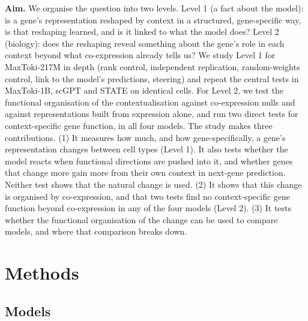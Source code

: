 \documentclass[
  11pt,
]{article}
\begin{document}
\textbf{Aim.} We organise the question into two levels. Level 1 (a fact
about the model): is a gene's representation reshaped by context in a
structured, gene-specific way, is that reshaping learned, and is it
linked to what the model does? Level 2 (biology): does the reshaping
reveal something about the gene's role in each context beyond what
co-expression already tells us? We study Level 1 for MaxToki-217M in
depth (rank control, independent replication, random-weights control,
link to the model's predictions, steering) and repeat the central tests
in MaxToki-1B, scGPT and STATE on identical cells. For Level 2, we test
the functional organisation of the contextualisation against
co-expression nulls and against representations built from expression
alone, and run two direct tests for context-specific gene function, in
all four models. The study makes three contributions. (1) It measures
how much, and how gene-specifically, a gene's representation changes
between cell types (Level 1). It also tests whether the model reacts
when functional directions are pushed into it, and whether genes that
change more gain more from their own context in next-gene prediction.
Neither test shows that the natural change is used. (2) It shows that
this change is organised by co-expression, and that two tests find no
context-specific gene function beyond co-expression in any of the four
models (Level 2). (3) It tests whether the functional organisation of
the change can be used to compare models, and where that comparison
breaks down.

\section{Methods}\label{methods}

\subsection{Models}\label{models}
\end{document}
